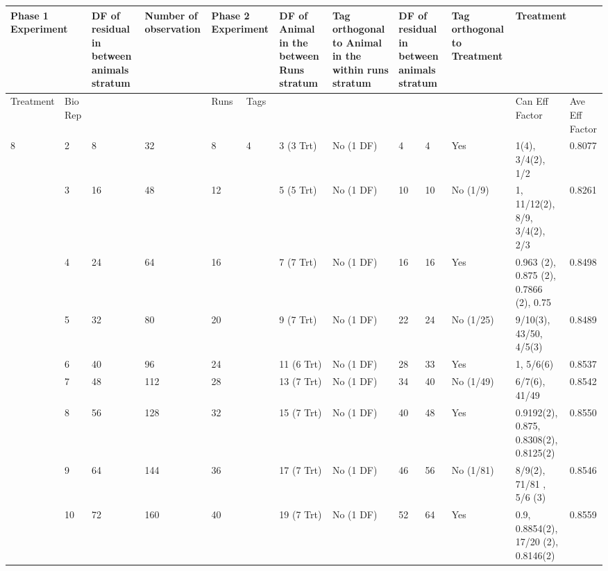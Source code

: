 \noindent \eject 

\begin{tabular}{|p{0.5in}|p{0.3in}|p{0.7in}|p{0.7in}|p{0.3in}|p{0.3in}|p{0.7in}|p{0.7in}|p{0.2in}|p{0.4in}|p{0.6in}|p{0.6in}|p{0.4in}|} \hline 
\multicolumn{2}{|p{1in}|}{Phase 1 Experiment} & DF of residual in between animals stratum & Number of observation  & \multicolumn{2}{|p{0.7in}|}{Phase 2 Experiment} & DF of Animal in the between Runs stratum  & Tag orthogonal to Animal in the within runs stratum & \multicolumn{2}{|p{0.6in}|}{DF of residual in between animals stratum} & Tag orthogonal to Treatment & \multicolumn{2}{|p{1.0in}|}{Treatment} \\ \hline 
Treatment & Bio Rep &  &  & Runs & Tags  &  &  & \multicolumn{2}{|p{0.6in}|}{} &  & Can Eff Factor & Ave Eff Factor \\ \hline 
8 & 2 & 8 & 32 & 8 & 4 & 3 (3 Trt) & No (1 DF) & 4 & 4 & Yes & 1(4), 3/4(2), 1/2 & 0.8077 \\ \hline 
 & 3 & 16 & 48 & 12 &  & 5 (5 Trt) & No (1 DF) & 10 & 10 & No (1/9) & 1,  11/12(2), 8/9, 3/4(2),  2/3 & 0.8261 \\ \hline 
 & 4 & 24 & 64 & 16 &  & 7 (7 Trt) & No (1 DF) & 16 & 16 & Yes & 0.963 (2), 0.875 (2), 0.7866 (2), 0.75 & 0.8498 \\ \hline 
 & 5 & 32 & 80 & 20 &  & 9 (7 Trt) & No (1 DF) & 22 & 24 & No (1/25) & 9/10(3), 43/50,  4/5(3) & 0.8489 \\ \hline 
 & 6 & 40 & 96 & 24 &  & 11 (6 Trt) & No (1 DF) & 28 & 33 & Yes & 1, 5/6(6) & 0.8537 \\ \hline 
 & 7 & 48 & 112 & 28 &  & 13 (7 Trt) & No (1 DF) & 34 & 40 & No (1/49) & 6/7(6), 41/49 & 0.8542 \\ \hline 
 & 8 & 56 & 128 & 32 &  & 15 (7 Trt) & No (1 DF) & 40 & 48 & Yes & 0.9192(2), 0.875, 0.8308(2), 0.8125(2)  & 0.8550 \\ \hline 
 & 9 & 64 & 144 & 36 &  & 17 (7 Trt) & No (1 DF) & 46 & 56 & No (1/81) & 8/9(2), 71/81 ,   5/6 (3) & 0.8546 \\ \hline 
 & 10 & 72 & 160 & 40 &  & 19 (7 Trt) & No (1 DF) & 52 & 64 & Yes & 0.9, 0.8854(2), 17/20 (2), 0.8146(2)  & 0.8559 \\ \hline 
\end{tabular}

\eject 

